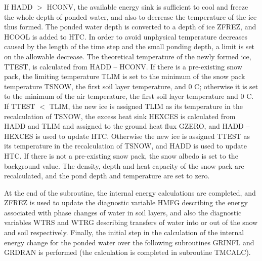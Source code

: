 If H\+A\+D\+D $>$ H\+C\+O\+N\+V, the available energy sink is sufficient to cool and freeze the whole depth of ponded water, and also to decrease the temperature of the ice thus formed. The ponded water depth is converted to a depth of ice Z\+F\+R\+E\+Z, and H\+C\+O\+O\+L is added to H\+T\+C. In order to avoid unphysical temperature decreases caused by the length of the time step and the small ponding depth, a limit is set on the allowable decrease. The theoretical temperature of the newly formed ice, T\+T\+E\+S\+T, is calculated from H\+A\+D\+D – H\+C\+O\+N\+V. If there is a pre-\/existing snow pack, the limiting temperature T\+L\+I\+M is set to the minimum of the snow pack temperature T\+S\+N\+O\+W, the first soil layer temperature, and 0 C; otherwise it is set to the minimum of the air temperature, the first soil layer temperature and 0 C. If T\+T\+E\+S\+T $<$ T\+L\+I\+M, the new ice is assigned T\+L\+I\+M as its temperature in the recalculation of T\+S\+N\+O\+W, the excess heat sink H\+E\+X\+C\+E\+S is calculated from H\+A\+D\+D and T\+L\+I\+M and assigned to the ground heat flux G\+Z\+E\+R\+O, and H\+A\+D\+D – H\+E\+X\+C\+E\+S is used to update H\+T\+C. Otherwise the new ice is assigned T\+T\+E\+S\+T as its temperature in the recalculation of T\+S\+N\+O\+W, and H\+A\+D\+D is used to update H\+T\+C. If there is not a pre-\/existing snow pack, the snow albedo is set to the background value. The density, depth and heat capacity of the snow pack are recalculated, and the pond depth and temperature are set to zero.

At the end of the subroutine, the internal energy calculations are completed, and Z\+F\+R\+E\+Z is used to update the diagnostic variable H\+M\+F\+G describing the energy associated with phase changes of water in soil layers, and also the diagnostic variables W\+T\+R\+S and W\+T\+R\+G describing transfers of water into or out of the snow and soil respectively. Finally, the initial step in the calculation of the internal energy change for the ponded water over the following subroutines G\+R\+I\+N\+F\+L and G\+R\+D\+R\+A\+N is performed (the calculation is completed in subroutine T\+M\+C\+A\+L\+C).